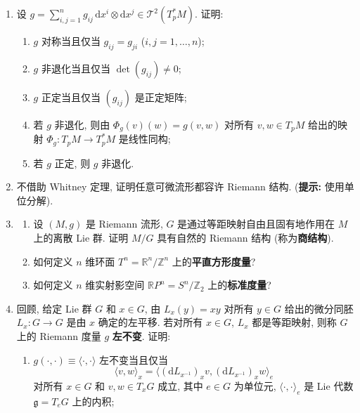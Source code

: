 \begin{RiemannExercise}\label{ex:riemannian-manifolds}
\begin{enumerate}[label=(\arabic*),ref=\arabic*,leftmargin=*]
\item\label{ex:matrix-criteria-for-metric-tensor} 设 $g=\sum_{i,j=1}^n g_{ij}\,\mathrm{d}x^i\otimes\mathrm{d}x^j\in\mathcal{T}^2(T_p^*M)$. 证明:
\begin{enumerate}[label=(\alph*),leftmargin=*]
\item $g$ 对称当且仅当 $g_{ij}=g_{ji}$ ($i,j=1,\ldots,n$);
\item $g$ 非退化当且仅当 $\det(g_{ij})\ne0$;
\item $g$ 正定当且仅当 $(g_{ij})$ 是正定矩阵;
\item 若 $g$ 非退化, 则由 $\Phi_g(v)(w)=g(v,w)$ 对所有 $v,w\in T_pM$ 给出的映射 $\Phi_g:T_pM\to T_p^*M$ 是线性同构;
\item 若 $g$ 正定, 则 $g$ 非退化.
\end{enumerate}
\item\label{ex:riemannian-structure-by-partition-of-unity} 不借助 Whitney 定理, 证明任意可微流形都容许 Riemann 结构.
{\small (\textbf{提示:} 使用单位分解).}
\item\label{ex:quotient-riemannian-structures}
\begin{enumerate}[label=(\alph*),leftmargin=*]
\item 设 $(M,g)$ 是 Riemann 流形, $G$ 是通过等距映射自由且固有地作用在 $M$ 上的离散 Lie 群. 证明 $M/G$ 具有自然的 Riemann 结构 (称为\textbf{商结构}).
\item 如何定义 $n$ 维环面 $T^n=\mathbb{R}^n/\mathbb{Z}^n$ 上的\textbf{平直方形度量}?
\item 如何定义 $n$ 维实射影空间 $\mathbb{R}P^n=S^n/\mathbb{Z}_2$ 上的\textbf{标准度量}?
\end{enumerate}
\item\label{ex:left-invariant-metric} 回顾, 给定 Lie 群 $G$ 和 $x\in G$, 由 $L_x(y)=xy$ 对所有 $y\in G$ 给出的微分同胚 $L_x:G\to G$ 是由 $x$ 确定的左平移. 若对所有 $x\in G$, $L_x$ 都是等距映射, 则称 $G$ 上的 Riemann 度量 $g$ \textbf{左不变}. 证明:
\begin{enumerate}[label=(\alph*),leftmargin=*]
\item $g(\cdot,\cdot)\equiv\langle\cdot,\cdot\rangle$ 左不变当且仅当
\[
  \langle v,w\rangle_x=\bigl\langle(\mathrm{d}L_{x^{-1}})_xv,(\mathrm{d}L_{x^{-1}})_xw\bigr\rangle_e
\]
对所有 $x\in G$ 和 $v,w\in T_xG$ 成立, 其中 $e\in G$ 为单位元, $\langle\cdot,\cdot\rangle_e$ 是 Lie 代数 $\mathfrak{g}=T_eG$ 上的内积;

\end{enumerate}
\end{enumerate}
\end{RiemannExercise}
